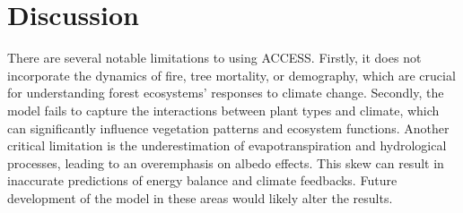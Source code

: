 \documentclass[]{article}
\begin{document}
\section{Discussion}

%
%
%

There are several notable limitations to using ACCESS.
Firstly, it does not incorporate the dynamics of fire, tree mortality, or demography, which are crucial for understanding forest ecosystems' responses to climate change.
Secondly, the model fails to capture the interactions between plant types and climate, which can significantly influence vegetation patterns and ecosystem functions.
Another critical limitation is the underestimation of evapotranspiration and hydrological processes, leading to an overemphasis on albedo effects.
This skew can result in inaccurate predictions of energy balance and climate feedbacks.
Future development of the model in these areas would likely alter the results.
\end{document}
